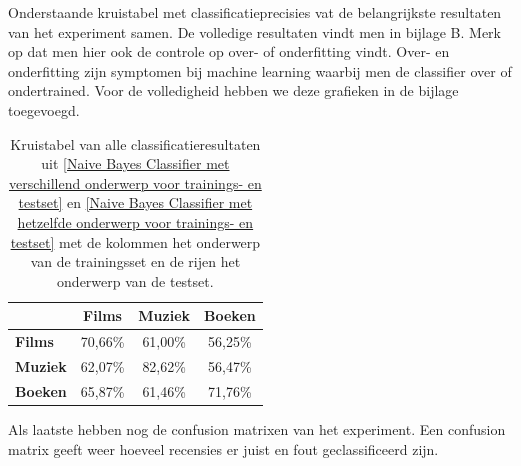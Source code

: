 Onderstaande kruistabel met classificatieprecisies vat de belangrijkste resultaten van het experiment samen. De volledige resultaten vindt men in bijlage B. Merk op dat men hier ook de controle op over- of onderfitting vindt. Over- en onderfitting zijn symptomen bij machine learning waarbij men de classifier over of ondertrained. Voor de volledigheid hebben we deze grafieken in de bijlage toegevoegd.    

\begin{table}[h]
\centering
\begin{tabular}{l|c|c|c|}
\cline{2-4}
                                      & \textbf{Films} & \textbf{Muziek} & \textbf{Boeken} \\ \hline
\multicolumn{1}{|l|}{\textbf{Films}} & 70,66\%         & 61,00\%         & 56,25\%         \\ \hline
\multicolumn{1}{|l|}{\textbf{Muziek}} & 62,07\%         & 82,62\%         & 56,47\%         \\ \hline
\multicolumn{1}{|l|}{\textbf{Boeken}} & 65,87\%         & 61,46\%         & 71,76\%         \\ \hline
\end{tabular}
\label{tab:alles}
\caption{Kruistabel van alle classificatieresultaten uit \ref{Naive Bayes Classifier met verschillend onderwerp voor trainings- en testset} en \ref{Naive Bayes Classifier met hetzelfde onderwerp voor trainings- en testset} met de kolommen het onderwerp van de trainingsset en de rijen het onderwerp van de testset.} 
\end{table}

Als laatste hebben nog de confusion matrixen van het experiment. Een confusion matrix geeft weer hoeveel recensies er juist en fout geclassificeerd zijn. 

